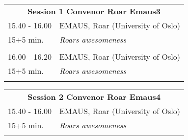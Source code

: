 \begin{table}[h!]
\begin{tabular}{p{3cm}p{13cm}}
\multicolumn{2}{c}{{\bf Session 1  \hfill Convenor Roar Emaus3}}\\ 
 15.40 - 16.00 & EMAUS, Roar (University of Oslo)\\ 
15+5 min. & {\it Roars awesomeness}\\ 
 & \\ 16.00 - 16.20 & EMAUS, Roar (University of Oslo)\\ 
15+5 min. & {\it Roars awesomeness}\\ 
 & \\ \end{tabular}
\end{table}

\hspace*{-10cm}
\begin{table}[h!]
\begin{tabular}{p{3cm}p{13cm}}
\multicolumn{2}{c}{{\bf Session 2  \hfill Convenor Roar Emaus4}}\\ 
 15.40 - 16.00 & EMAUS, Roar (University of Oslo)\\ 
15+5 min. & {\it Roars awesomeness}\\ 
 & \\ \end{tabular}
\end{table}

\hspace*{-10cm}
